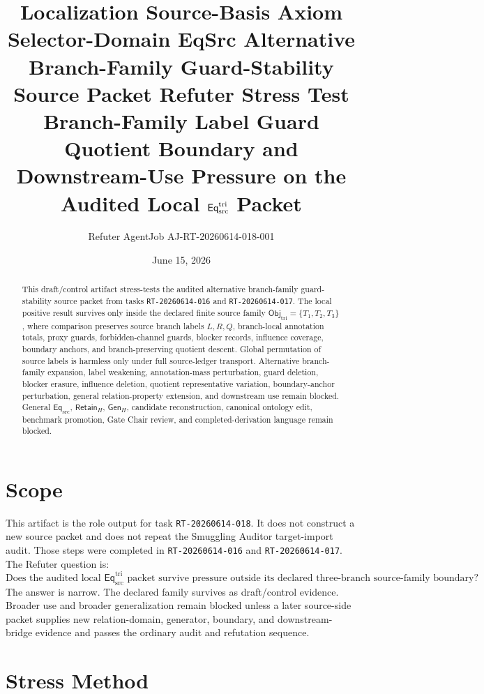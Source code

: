 \documentclass[11pt]{article}
\title{\textbf{Localization Source-Basis Axiom Selector-Domain EqSrc Alternative Branch-Family Guard-Stability Source Packet Refuter Stress Test}\\[0.35em]
\large Branch-Family Label Guard Quotient Boundary and Downstream-Use Pressure on the Audited Local \(\EqTri\) Packet}
\author{Refuter AgentJob AJ-RT-20260614-018-001}
\date{June 15, 2026}
\newcommand{\EqSrc}{\mathsf{Eq}_{\mathrm{src}}}
\newcommand{\EqTri}{\mathsf{Eq}_{\mathrm{src}}^{\mathrm{tri}}}
\newcommand{\ObjTri}{\mathsf{Obj}_{\mathrm{tri}}}
\newcommand{\RetainH}{\mathsf{Retain}_{H}}
\newcommand{\GenH}{\mathsf{Gen}_{H}}
\begin{document}
\maketitle

\begin{abstract}
This draft/control artifact stress-tests the audited alternative
branch-family guard-stability source packet from tasks
\texttt{RT-20260614-016} and \texttt{RT-20260614-017}. The local
positive result survives only inside the declared finite source family
\(\ObjTri=\{T_{1},T_{2},T_{3}\}\), where comparison preserves source
branch labels \(L,R,Q\), branch-local annotation totals, proxy guards,
forbidden-channel guards, blocker records, influence coverage, boundary
anchors, and branch-preserving quotient descent. Global permutation of
source labels is harmless only under full source-ledger transport.
Alternative branch-family expansion, label weakening, annotation-mass
perturbation, guard deletion, blocker erasure, influence deletion,
quotient representative variation, boundary-anchor perturbation,
general relation-property extension, and downstream use remain blocked.
General \(\EqSrc\), \(\RetainH\), \(\GenH\), candidate reconstruction,
canonical ontology edit, benchmark promotion, Gate Chair review, and
completed-derivation language remain blocked.
\end{abstract}

\section{Scope}

This artifact is the role output for task \texttt{RT-20260614-018}. It
does not construct a new source packet and does not repeat the
Smuggling Auditor target-import audit. Those steps were completed in
\texttt{RT-20260614-016} and \texttt{RT-20260614-017}. The Refuter
question is:
\[
    \text{Does the audited local }\EqTri\text{ packet survive pressure
    outside its declared three-branch source-family boundary?}
\]
The answer is narrow. The declared family survives as draft/control
evidence. Broader use and broader generalization remain blocked unless a
later source-side packet supplies new relation-domain, generator,
boundary, and downstream-bridge evidence and passes the ordinary audit
and refutation sequence.

\section{Stress Method}
\end{document}
